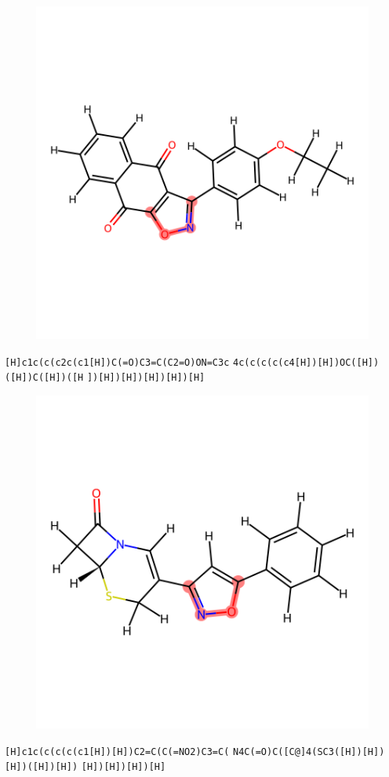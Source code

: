 \documentclass{article}
\begin{document}
\begin{figure}[ht]
\centering
    \includegraphics{mol290.png}
\end{figure}
\verb|[H]c1c(c(c2c(c1[H])C(=O)C3=C(C2=O)ON=C3c| \verb|4c(c(c(c(c4[H])[H])OC([H])([H])C([H])([H| \verb|])[H])[H])[H])[H])[H]|

\begin{figure}[ht]
\centering
    \includegraphics{mol291.png}
\end{figure}
\verb|[H]c1c(c(c(c(c1[H])[H])C2=C(C(=NO2)C3=C(| \verb|N4C(=O)C([C@]4(SC3([H])[H])[H])([H])[H])| \verb|[H])[H])[H])[H]|
\end{document}
